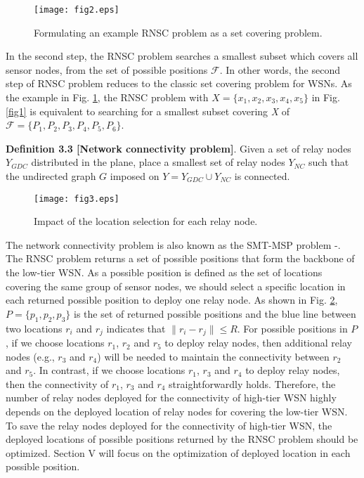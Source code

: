 \documentclass[journal]{IEEEtran}
\begin{document}
\begin{figure}
\begin{center}
\texttt{[image: fig2.eps]}    \caption{Formulating an example RNSC problem as a set covering problem.}
\label{fig2}                                 \end{center}                                 \end{figure}

In the second step, the RNSC problem searches a smallest subset which covers all sensor nodes, from the set of possible positions $\mathcal{F}$. In other words, the second step of RNSC problem reduces to the classic set covering problem for WSNs. As the example in Fig. \ref{fig2}, the RNSC problem with $X=\{x_1, x_2, x_3, x_4, x_5\}$ in Fig. \ref{fig1} is equivalent to searching for a smallest subset covering \emph{X} of $\mathcal{F}=\{P_1, P_2, P_3, P_4, P_5, P_6\}$.

\textbf{Definition 3.3 [Network connectivity problem]}. Given a set of relay nodes $Y_{GDC}$ distributed in the plane, place a smallest set of relay
nodes $Y_{NC}$ such that the undirected graph $G$ imposed on $Y=Y_{GDC}\cup Y_{NC}$ is connected.

\begin{figure}
\begin{center}
\texttt{[image: fig3.eps]}    \caption{Impact of the location selection for each relay node.}
\label{fig3}                                 \end{center}                                 \end{figure}

The network connectivity problem is also known as the SMT-MSP problem
\cite{Lin99}-\cite{Dandekar12}. The RNSC problem returns a set of possible positions that form the backbone of the low-tier WSN. As a possible position is defined as the set of locations covering the same group of sensor nodes, we should select a specific location in each returned possible position to deploy one relay node. As shown in Fig. \ref{fig3}, $P=\{p_1, p_2, p_3\}$ is the set of returned possible positions and the blue line between two locations $r_i$ and $r_j$ indicates that $\|r_i-r_j\|\leq R$. For possible positions in $P$, if we choose locations $r_1$, $r_2$ and $r_5$ to deploy
relay nodes, then additional relay nodes (e.g., $r_3$ and $r_4$) will be needed to maintain the connectivity between $r_2$ and $r_5$. In contrast, if
we choose locations $r_1$, $r_3$ and $r_4$ to deploy relay nodes, then the connectivity of $r_1$, $r_3$ and $r_4$ straightforwardly holds. Therefore, the number of relay nodes deployed for the connectivity of high-tier WSN highly depends on the deployed location of relay nodes for covering the low-tier WSN. To save the relay nodes deployed for the connectivity of high-tier WSN, the deployed locations of possible positions returned by the RNSC problem should be optimized. Section V will focus on the optimization of deployed location in each possible position.
\end{document}
